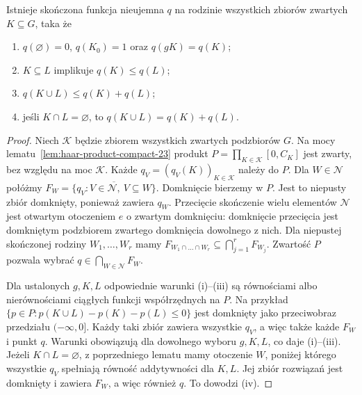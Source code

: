 \begin{lemat}
\label{lem:haar-content-23}
Istnieje skończona funkcja nieujemna $q$ na rodzinie
wszystkich zbiorów zwartych $K\subseteq G$, taka że
\begin{enumerate}[label=(\roman*)]
\item $q(\varnothing)=0$, $q(K_0)=1$ oraz $q(gK)=q(K)$;
\item $K\subseteq L$ implikuje $q(K)\le q(L)$;
\item $q(K\cup L)\le q(K)+q(L)$;
\item jeśli $K\cap L=\varnothing$, to
      $q(K\cup L)=q(K)+q(L)$.
\end{enumerate}
\end{lemat}
\begin{proof}
Niech $\mathcal K$ będzie zbiorem wszystkich zwartych
podzbiorów $G$. Na mocy
lematu~\ref{lem:haar-product-compact-23} produkt
$P=\prod_{K\in\mathcal K}[0,C_K]$ jest zwarty,
bez względu na moc $\mathcal K$.
Każde $q_V=(q_V(K))_{K\in\mathcal K}$ należy do $P$.
Dla $W\in\mathcal N$ połóżmy
$F_W=\overline{\{q_V:V\in\mathcal N,\ V\subseteq W\}}$.
Domknięcie bierzemy w $P$. Jest to niepusty zbiór
domknięty, ponieważ zawiera $q_W$.
Przecięcie skończenie wielu elementów $\mathcal N$
jest otwartym otoczeniem $e$ o zwartym domknięciu:
domknięcie przecięcia jest domkniętym podzbiorem
zwartego domknięcia dowolnego z nich.
Dla niepustej skończonej rodziny $W_1,\dots,W_r$ mamy
$F_{W_1\cap\dots\cap W_r}\subseteq\bigcap_{j=1}^rF_{W_j}$.
Zwartość $P$ pozwala wybrać
$q\in\bigcap_{W\in\mathcal N}F_W$.

Dla ustalonych $g,K,L$ odpowiednie warunki (i)--(iii)
są równościami albo nierównościami ciągłych
funkcji współrzędnych na $P$. Na przykład
$\{p\in P:p(K\cup L)-p(K)-p(L)\le0\}$ jest
domknięty jako przeciwobraz przedziału $(-\infty,0]$.
Każdy taki zbiór zawiera wszystkie $q_V$,
a więc także każde $F_W$ i punkt $q$.
Warunki obowiązują dla dowolnego wyboru
$g,K,L$, co daje (i)--(iii).
Jeżeli $K\cap L=\varnothing$, z poprzedniego lematu
mamy otoczenie $W$, poniżej którego wszystkie $q_V$
spełniają równość addytywności dla $K,L$.
Jej zbiór rozwiązań jest domknięty i zawiera $F_W$,
a więc również $q$. To dowodzi (iv).
\end{proof}

